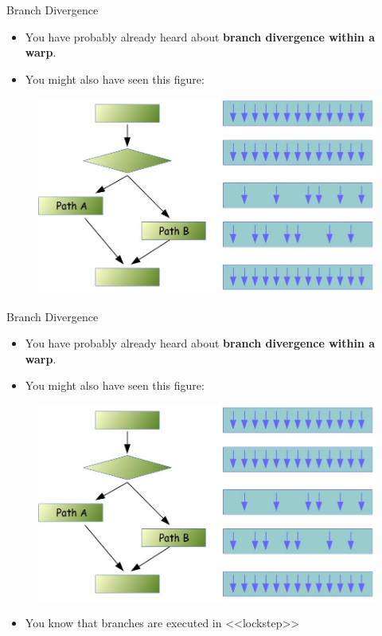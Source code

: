 \documentclass[9pt]{beamer}
\begin{document}
\begin{frame}[t]{Branch Divergence }
\begin{itemize}
\item You have probably already heard about \textbf{branch divergence within a warp}.
\item You might also have seen this figure: \\
\end{itemize}
\begin{figure}
	\includegraphics[scale=0.22]{images/bd-1.jpg}
	\centering
\end{figure}
\end{frame}

\begin{frame}[t]{Branch Divergence }
\begin{itemize}
\item You have probably already heard about \textbf{branch divergence within a warp}.
\item You might also have seen this figure: \\
\end{itemize}
\begin{figure}
	\includegraphics[scale=0.22]{images/bd-1.jpg}
	\centering
\end{figure}
\begin{itemize}
\item You know that branches are executed in <<lockstep>>
\end{itemize}
\end{frame}
\end{document}
